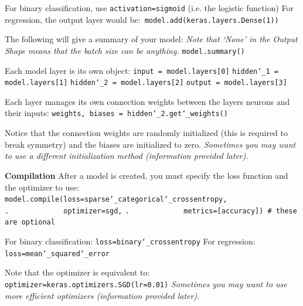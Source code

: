 For binary classification, use \texttt{activation=\textquotesingle sigmoid\textquotesingle} (i.e. the logistic function)\newline
For regression, the output layer would be:~\texttt{model.add(keras.layers.Dense(1))}

The following will give a summary of your model:\newline
\textit{Note that `None' in the Output Shape means that the batch size can be anything.}\newline
\texttt{model.summary()}

Each model layer is its own object:\newline
\texttt{input = model.layers[0]}\newline
\texttt{hidden\char`_1 = model.layers[1]}\newline
\texttt{hidden\char`_2 = model.layers[2]}\newline
\texttt{output = model.layers[3]}

Each layer manages its own connection weights between the layers neurons and their inputs:\newline
\texttt{weights, biases = hidden\char`_2.get\char`_weights()}

Notice that the connection weights are randomly initialized (this is required to break symmetry)
and the biases are initialized to zero.\newline
\textit{Sometimes you may want to use a different initialization method (information provided later).}

\newpage
\textbf{Compilation}\newline
After a model is created, you must specify the loss function and the optimizer to use:\newline
\texttt{model.compile(loss=\textquotesingle sparse\char`_categorical\char`_crossentropy\textquotesingle,}\newline
\texttt{.~~~~~~~~~~~~~optimizer=\textquotesingle sgd\textquotesingle,}\newline
\texttt{.~~~~~~~~~~~~~metrics=[\textquotesingle accuracy\textquotesingle]) \# these are optional}

For binary classification: \texttt{loss=\textquotesingle binary\char`_crossentropy\textquotesingle}\newline
For regression: \texttt{loss=\textquotesingle mean\char`_squared\char`_error\textquotesingle}

Note that the optimizer is equivalent to: \texttt{optimizer=keras.optimizers.SGD(lr=0.01)}\newline
\textit{Sometimes you may want to use more efficient optimizers (information provided later).}\newline

